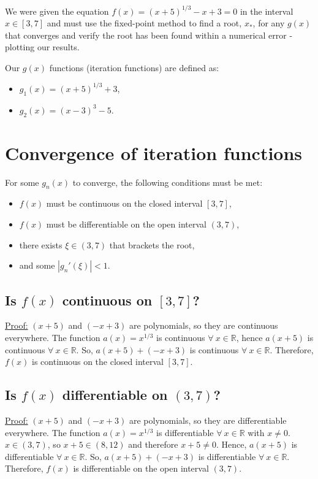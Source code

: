 \documentclass[../main.tex]{subfiles}
\begin{document}
    We were given the equation $f(x) = (x + 5)^{1/3} - x + 3 = 0$ in the interval $x \in [3,7]$ and must use
    the fixed-point method to find a root, $x_{*}$, for any $g(x)$ that converges and verify
    the root has been found within a numerical error - plotting our results.

    Our $g(x)$ functions (iteration functions) are defined as:
    \begin{itemize}
        \item $g_{1}(x) = (x + 5)^{1/3} + 3$,
        \item $g_{2}(x) = (x - 3)^{3} - 5$.
    \end{itemize}
    
    \section{Convergence of iteration functions}\label{sec:fixed_point_convergence}
    For some $g_{n}(x)$ to converge, the following conditions must be met:
    \begin{itemize}
        \item $f(x)$ must be continuous on the closed interval $[3,7]$,
        \item $f(x)$ must be differentiable on the open interval $(3,7)$,
        \item there exists $\xi \in (3,7)$ that brackets the root,
        \item and some $|g_{n}'(\xi)| < 1$.
    \end{itemize}

    \subsection*{Is $f(x)$ continuous on $[3,7]$?}\label{subsec:fixed-point-continuous}
    \underline{Proof:} $(x + 5)$ and $(-x + 3)$ are polynomials, so they are continuous everywhere.
    The function $a(x) = x^{1/3}$ is continuous $\forall \ x \in \mathbb{R}$,
    hence $a(x + 5)$ is continuous $\forall \ x \in \mathbb{R}$.
    So, $a(x + 5) + (-x + 3)$ is continuous $\forall \ x \in \mathbb{R}$.
    Therefore, $f(x)$ is continuous on the closed interval $[3,7]$.

    \subsection*{Is $f(x)$ differentiable on $(3,7)$?}\label{subsec:fixed-point-differentiable}
    \underline{Proof:} $(x + 5)$ and $(-x + 3)$ are polynomials, so they are differentiable everywhere.
    The function $a(x) = x^{1/3}$ is differentiable $\forall \ x \in \mathbb{R}$ with $x \neq 0$.
    $x \in (3,7)$, so $x + 5 \in (8,12)$ and therefore $x + 5 \neq 0$.
    Hence, $a(x + 5)$ is differentiable $\forall \ x \in \mathbb{R}$.
    So, $a(x + 5) + (-x + 3)$ is differentiable $\forall \ x \in \mathbb{R}$.
    Therefore, $f(x)$ is differentiable on the open interval $(3,7)$.
\end{document}
